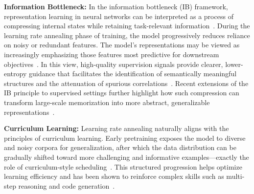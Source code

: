 \noindent\textbf{Information Bottleneck:} 
In the information bottleneck (IB) framework, representation learning in neural networks can be interpreted as a process of compressing internal states while retaining task-relevant information~\cite{tishby2015deep}. During the learning rate annealing phase of training, the model progressively reduces reliance on noisy or redundant features. The model's representations may be viewed as increasingly emphasizing those features most predictive for downstream objectives~\cite{alemi2016deep}. In this view, high-quality supervision signals provide clearer, lower-entropy guidance that facilitates the identification of semantically meaningful structures and the attenuation of spurious correlations~\cite{izmailov2022feature}. Recent extensions of the IB principle to supervised settings further highlight how such compression can transform large-scale memorization into more abstract, generalizable representations~\cite{weingarten2025supervised}.

\noindent\textbf{Curriculum Learning:} 
Learning rate annealing naturally aligns with the principles of curriculum learning. Early pretraining exposes the model to diverse and noisy corpora for generalization, after which the data distribution can be gradually shifted toward more challenging and informative examples—exactly the role of curriculum-style scheduling~\cite{nair2024curriculum, chaudhry2024data}. This structured progression helps optimize learning efficiency and has been shown to reinforce complex skills such as multi-step reasoning and code generation~\cite{wang2025dump, jia2022sample}.



